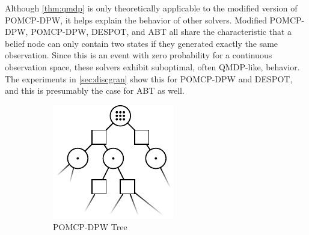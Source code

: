 Although \cref{thm:qmdp} is only theoretically applicable to the modified version of POMCP-DPW, it helps explain the behavior of other solvers.
Modified POMCP-DPW, POMCP-DPW, DESPOT, and ABT all share the characteristic that a belief node can only contain two states if they generated exactly the same observation.
Since this is an event with zero probability for a continuous observation space, these solvers exhibit suboptimal, often QMDP-like, behavior.
The experiments in \cref{sec:discgran} show this for POMCP-DPW and DESPOT, and this is presumably the case for ABT as well.


\begin{figure}[htpb]
    \centering
    \begin{subfigure}[b]{0.45\columnwidth}
        \centering
        \includegraphics[width=\textwidth]{media/dpw_tree.pdf}
        \caption{POMCP-DPW Tree}
    \end{subfigure}
    \begin{subfigure}[b]{0.45\columnwidth}
        \centering

\end{subfigure}
\end{figure}
